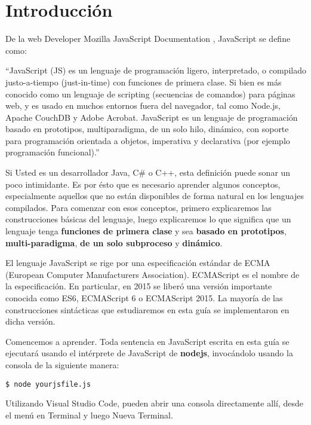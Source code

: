 \documentclass[a4paper, oneside, titlepage, 12pt]{paper}
\begin{document}
\section{Introducción}

De la web Developer Mozilla JavaScript Documentation \cite{mozilla}, JavaScript se define como:

``JavaScript (JS) es un lenguaje de programación ligero, interpretado, o compilado justo-a-tiempo (just-in-time) con funciones de primera clase. Si bien es más conocido como un lenguaje de scripting (secuencias de comandos) para páginas web, y es usado en muchos entornos fuera del navegador, tal como Node.js, Apache CouchDB y Adobe Acrobat. JavaScript es un lenguaje de programación basado en prototipos, multiparadigma, de un solo hilo, dinámico, con soporte para programación orientada a objetos, imperativa y declarativa (por ejemplo programación funcional).''
\newline

Si Usted es un desarrollador Java, C\# o C++, esta definición puede sonar un poco intimidante. Es por ésto que es necesario aprender algunos conceptos, especialmente aquellos que no están disponibles de forma natural en los lenguajes compilados. Para comenzar con esos conceptos, primero explicaremos las construcciones básicas del lenguaje, luego explicaremos lo que significa que un lenguaje tenga \textbf{funciones de primera clase} y sea \textbf {basado en prototipos}, \textbf{multi-paradigma}, \textbf{de un solo subproceso} y \textbf{dinámico}.
\newline

El lenguaje JavaScript se rige por una especificación estándar de ECMA\cite{ecma} (European Computer Manufacturers Association). ECMAScript es el nombre de la especificación. En particular, en 2015 se liberó una versión importante conocida como ES6, ECMAScript 6 o ECMAScript 2015. La mayoría de las construcciones sintácticas que estudiaremos en esta guía se implementaron en dicha versión.
\newline

Comencemos a aprender. Toda sentencia en JavaScript escrita en esta guía se ejecutará usando el intérprete de JavaScript de \textbf{nodejs}, invocándolo usando la consola de la siguiente manera:
\begin{verbatim}
$ node yourjsfile.js
\end{verbatim}

Utilizando Visual Studio Code, pueden abrir una consola directamente allí, desde el menú en \textsf{Terminal} y luego \textsf{Nueva Terminal}. 
\newline
\end{document}
